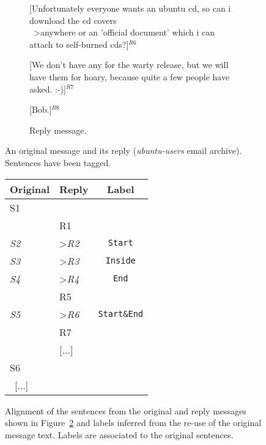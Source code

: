 \begin{figure}
\begin{minipage}{\textwidth}
{{\begin{subfigure}
                    \textgreater [Unfortunately everyone wants an ubuntu cd, so can i download the cd covers \\ \ 
                    \textgreater anywhere or an 'official document' which i can attach to self-burned cds?]$^{R6}$\vspace{0.3cm}

                    [We don't have any for the warty release, but we will have them for hoary, %
                    because quite a few people have asked. :-)]$^{R7}$\vspace{0.3cm}

                    [Bob.]$^{R8}$ %

                    \caption{Reply message.}
                    \label{fig:exampleReply}
                \end{subfigure}
            }
        }
    \end{minipage}\vspace{1cm}

    \caption{An original message and its reply (\textit{ubuntu-users} email archive). Sentences have been tagged.}
    \label{fig:exampleSourceReplyMessage}
\end{figure}

\begin{figure}
    \begin{minipage}{\textwidth}
        \small\centering
        \begin{tabular}{*{2}{|l}|c|}
        \hline
        \textbf{Original} & \textbf{Reply} & \textbf{Label}\\
        	\hline
            S1  & & \\
            & R1 & \\
            \textit{S2}  & \textgreater \textit{R2}& \texttt{Start}\\
            \textit{S3}  & \textgreater \textit{R3}& \texttt{Inside}\\
            \textit{S4}  & \textgreater \textit{R4}& \texttt{End}\\
            & R5 & \\
            \textit{S5}  & \textgreater \textit{R6} & \texttt{Start\&End}\\
            & R7 & \\
            & [...] & \\
            S6    &  & \\ \ 
            [...] \    &  & \\
            \hline
        \end{tabular}
    \end{minipage}

    \caption{Alignment of the sentences from the original and reply messages shown in Figure~\ref{fig:exampleSourceReplyMessage} and labels inferred from the re-use of the original message text. Labels are associated to the original sentences.}
    \label{fig:exampleSegmentationLabels}
\end{figure}